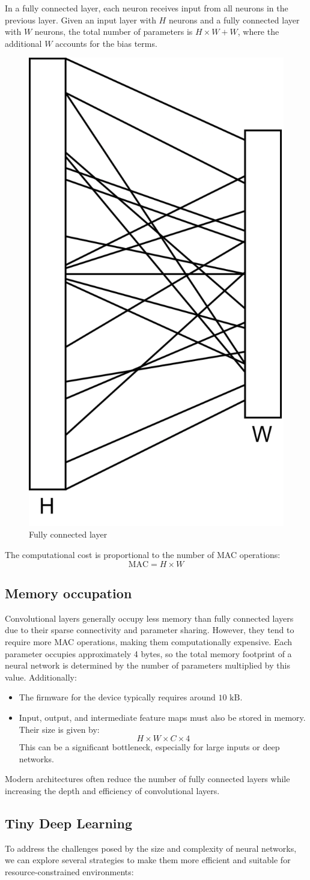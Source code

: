 In a fully connected layer, each neuron receives input from all neurons in the previous layer. 
Given an input layer with $H$ neurons and a fully connected layer with $W$ neurons, the total number of parameters is $H\times W+W$, where the additional $W$ accounts for the bias terms.
\begin{figure}[H]
    \centering
    \includegraphics[width=0.25\linewidth]{images/eeai8.png}
    \caption{Fully connected layer}
\end{figure}
The computational cost is proportional to the number of MAC operations:
\[\text{MAC}=H\times W\]

\subsection{Memory occupation}
Convolutional layers generally occupy less memory than fully connected layers due to their sparse connectivity and parameter sharing. 
However, they tend to require more MAC operations, making them computationally expensive. 
Each parameter occupies approximately 4 bytes, so the total memory footprint of a neural network is determined by the number of parameters multiplied by this value.
Additionally:
\begin{itemize}
    \item The firmware for the device typically requires around $10\text{ kB}$.
    \item Input, output, and intermediate feature maps must also be stored in memory. 
        Their size is given by:
        \[H\times W \times C\times 4\]
        This can be a significant bottleneck, especially for large inputs or deep networks.
\end{itemize}
\noindent Modern architectures often reduce the number of fully connected layers while increasing the depth and efficiency of convolutional layers.

\subsection{Tiny Deep Learning}
To address the challenges posed by the size and complexity of neural networks, we can explore several strategies to make them more efficient and suitable for resource-constrained environments:

